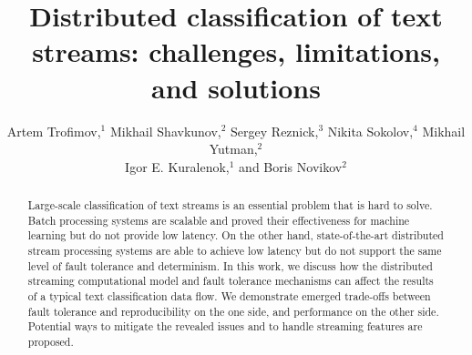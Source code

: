 \documentclass[sigconf]{acmart}
\theoremstyle{remark}
\begin{document}

\title {Distributed classification of text streams: challenges, limitations, and solutions}

\author{Artem Trofimov,$^ {1}$    Mikhail Shavkunov,$^2$    Sergey Reznick,$^3$     Nikita Sokolov,$^{4}$   Mikhail Yutman,$^2$ \\   Igor E. Kuralenok,$^1$    and  Boris Novikov$^ {2}$ }

\begin{abstract}

Large-scale classification of text streams is an essential problem that is hard to solve. Batch processing systems are scalable and proved their effectiveness for machine learning but do not provide low latency. On the other hand, state-of-the-art distributed stream processing systems are able to achieve low latency but do not support the same level of fault tolerance and determinism. In this work, we discuss how the distributed streaming computational model and fault tolerance mechanisms can affect the results of a typical text classification data flow. We demonstrate emerged trade-offs between fault tolerance and reproducibility on the one side, and performance on the other side. Potential ways to mitigate the revealed issues and to handle streaming features are proposed.

\end{abstract}


\maketitle

\thispagestyle{empty}
\end{document}
